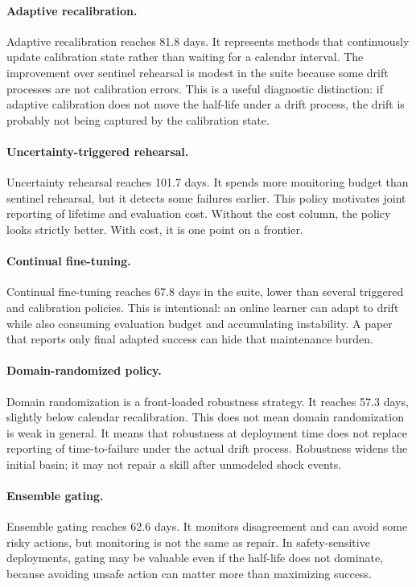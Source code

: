 \documentclass{article}
\begin{document}
\paragraph{Adaptive recalibration.}
Adaptive recalibration reaches 81.8 days. It represents methods that continuously
update calibration state rather than waiting for a calendar interval. The
improvement over sentinel rehearsal is modest in the suite because some drift
processes are not calibration errors. This is a useful diagnostic distinction:
if adaptive calibration does not move the half-life under a drift process, the
drift is probably not being captured by the calibration state.

\paragraph{Uncertainty-triggered rehearsal.}
Uncertainty rehearsal reaches 101.7 days. It spends more monitoring budget than
sentinel rehearsal, but it detects some failures earlier. This policy motivates
joint reporting of lifetime and evaluation cost. Without the cost column, the
policy looks strictly better. With cost, it is one point on a frontier.

\paragraph{Continual fine-tuning.}
Continual fine-tuning reaches 67.8 days in the suite, lower than several
triggered and calibration policies. This is intentional: an online learner can
adapt to drift while also consuming evaluation budget and accumulating
instability. A paper that reports only final adapted success can hide that
maintenance burden.

\paragraph{Domain-randomized policy.}
Domain randomization is a front-loaded robustness strategy. It reaches 57.3
days, slightly below calendar recalibration. This does not mean domain
randomization is weak in general. It means that robustness at deployment time
does not replace reporting of time-to-failure under the actual drift process.
Robustness widens the initial basin; it may not repair a skill after unmodeled
shock events.

\paragraph{Ensemble gating.}
Ensemble gating reaches 62.6 days. It monitors disagreement and can avoid some
risky actions, but monitoring is not the same as repair. In safety-sensitive
deployments, gating may be valuable even if the half-life does not dominate,
because avoiding unsafe action can matter more than maximizing success.
\end{document}
